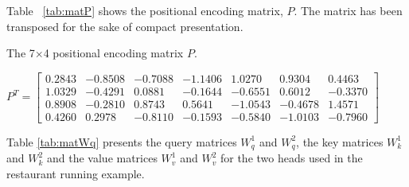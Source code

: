 \documentclass[algorithms,article,submit,pdftex,moreauthors]{Definitions/mdpi}
\begin{document}
\noindent Table ~\ref{tab:matP} shows the positional encoding matrix, $P$. The matrix has been transposed for the sake of compact presentation.

\begin{table}[ht]
	\centering
	\caption{The 7$\times$4 positional encoding matrix $P$.}
	\label{tab:matP}
	$
	P^T = \begin{bmatrix}
	0.2843 & -0.8508 & -0.7088 & -1.1406 &  1.0270 &  0.9304 &  0.4463 \\
	1.0329 & -0.4291 &  0.0881 & -0.1644 & -0.6551 &  0.6012 & -0.3370 \\
	0.8908 & -0.2810 &  0.8743 &  0.5641 & -1.0543 & -0.4678 &  1.4571 \\
	0.4260 &  0.2978 & -0.8110 & -0.1593 & -0.5840 & -1.0103 & -0.7960
	\end{bmatrix}
	$
\end{table}

\noindent Table \ref{tab:matWq} presents the query matrices $W^1_q$ and $W^2_q$, the key matrices $W^1_k$ and $W^2_k$ and the value matrices $W^1_v$ and $W^2_v$ for the two heads used in the restaurant running example.
\end{document}

